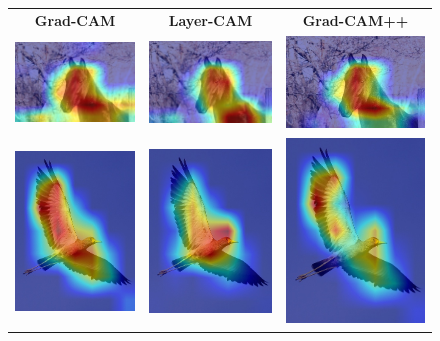 \begin{figure}[H]
  \centering
  \setlength{\tabcolsep}{0.5pt} %
  \renewcommand{\arraystretch}{0.4}

  \begin{tabular}{c c c}
    \textbf{Grad-CAM} & \textbf{Layer-CAM} & \textbf{Grad-CAM++} \\
    [2pt]
    \includegraphics[width=0.18\linewidth, height=0.18\linewidth]{figures/cams/gradcam/2007_009807_12} &
    \includegraphics[width=0.18\linewidth, height=0.18\linewidth]{figures/cams/layercam/2007_009807_12} &
    \includegraphics[width=0.18\linewidth, height=0.18\linewidth]{figures/cams/gradcampp/2007_009807_12} \\

    \includegraphics[width=0.18\linewidth, height=0.18\linewidth]{figures/cams/gradcam/2011_001967_2} &
    \includegraphics[width=0.18\linewidth, height=0.18\linewidth]{figures/cams/layercam/2011_001967_2} &
    \includegraphics[width=0.18\linewidth, height=0.18\linewidth]{figures/cams/gradcampp/2011_001967_2} \\


\end{tabular}
\end{figure}
